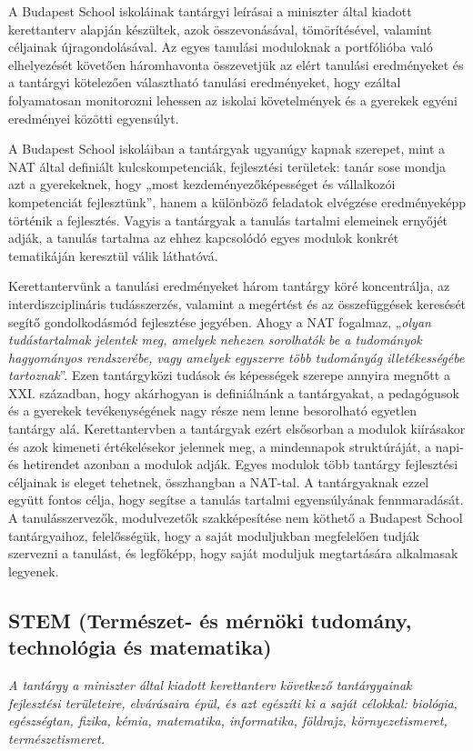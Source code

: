 A Budapest School iskoláinak tantárgyi leírásai a miniszter által kiadott
kerettanterv alapján készültek, azok összevonásával, tömörítésével, valamint
céljainak újragondolásával. Az egyes tanulási moduloknak a portfólióba való
elhelyezését követően háromhavonta összevetjük az elért tanulási eredményeket és 
a tantárgyi kötelezően választható tanulási eredményeket, hogy ezáltal folyamatosan monitorozni lehessen
az iskolai követelmények és a gyerekek egyéni eredményei közötti egyensúlyt.

A Budapest School iskoláiban a tantárgyak ugyanúgy kapnak szerepet, mint a NAT
által definiált kulcskompetenciák, fejlesztési területek: tanár sose mondja azt a gyerekeknek, hogy „most
kezdeményezőképességet és vállalkozói kompetenciát fejlesztünk'', hanem a
különböző feladatok elvégzése eredményeképp történik a fejlesztés. Vagyis a
tantárgyak a tanulás tartalmi elemeinek ernyőjét adják, a tanulás tartalma az
ehhez kapcsolódó egyes modulok konkrét tematikáján keresztül válik láthatóvá.

Kerettantervünk a tanulási eredményeket három tantárgy köré koncentrálja, az interdiszciplináris
tudásszerzés, valamint a megértést és az összefüggések keresését segítő
gondolkodásmód fejlesztése jegyében. Ahogy a NAT fogalmaz, „\emph{olyan
tudástartalmak jelentek meg, amelyek nehezen sorolhatók be a tudományok
hagyományos rendszerébe, vagy amelyek egyszerre több tudományág illetékességébe
tartoznak}''. Ezen tantárgyközi tudások és képességek szerepe annyira megnőtt a
XXI. században, hogy akárhogyan is definiálnánk a tantárgyakat, a pedagógusok
és a gyerekek tevékenységének nagy része nem lenne besorolható egyetlen tantárgy
alá. Kerettantervben a tantárgyak ezért elsősorban a modulok kiírásakor és azok
kimeneti értékelésekor jelennek meg, a mindennapok struktúráját, a napi- és
hetirendet azonban a modulok adják. Egyes modulok több tantárgy fejlesztési
céljainak is eleget tehetnek, összhangban a NAT-tal. A tantárgyaknak ezzel
együtt fontos célja, hogy segítse a tanulás tartalmi egyensúlyának
fennmaradását. A tanulásszervezők, modulvezetők szakképesítése nem köthető a Budapest
School tantárgyaihoz, felelősségük, hogy a saját moduljukban megfelelően tudják
szervezni a tanulást, és legfőképp, hogy saját moduljuk megtartására alkalmasak
legyenek.

\subsection[STEM]{STEM	(Természet- és mérnöki	tudomány, technológia és
  matematika)}
\emph{A tantárgy a miniszter által kiadott kerettanterv következő tantárgyainak
  fejlesztési területeire, elvárásaira épül, és azt egészíti ki a saját célokkal:
  biológia, egészségtan, fizika, kémia, matematika, informatika, földrajz,
  környezetismeret, természetismeret.}

